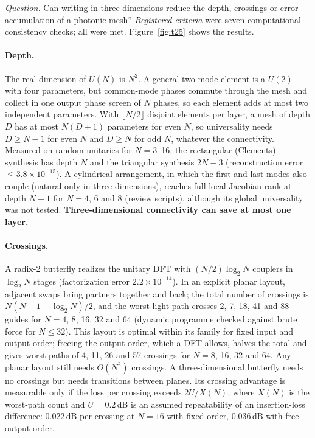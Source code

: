 \documentclass[10pt,a4paper]{article}
\begin{document}
\emph{Question.} Can writing in three dimensions reduce the depth, crossings or error accumulation of a photonic mesh? \emph{Registered criteria} were seven computational consistency checks; all were met. Figure~\ref{fig:t25} shows the results.

\paragraph{Depth.} The real dimension of $U(N)$ is $N^2$. A general two-mode element is a $U(2)$ with four parameters, but common-mode phases commute through the mesh and collect in one output phase screen of $N$ phases, so each element adds at most two independent parameters. With $\lfloor N/2\rfloor$ disjoint elements per layer, a mesh of depth $D$ has at most $N(D+1)$ parameters for even $N$, so universality needs $D\ge N-1$ for even $N$ and $D\ge N$ for odd $N$, whatever the connectivity. Measured on random unitaries for $N=3$--16, the rectangular (Clements) synthesis \cite{Clements2016} has depth $N$ and the triangular synthesis $2N-3$ (reconstruction error $\le3.8\times10^{-15}$). A cylindrical arrangement, in which the first and last modes also couple (natural only in three dimensions), reaches full local Jacobian rank at depth $N-1$ for $N=4$, 6 and 8 (review scripts), although its global universality was not tested. \textbf{Three-dimensional connectivity can save at most one layer.}

\paragraph{Crossings.} A radix-2 butterfly realizes the unitary DFT with $(N/2)\log_2N$ couplers in $\log_2N$ stages (factorization error $2.2\times10^{-14}$). In an explicit planar layout, adjacent swaps bring partners together and back; the total number of crossings is $N(N-1-\log_2N)/2$, and the worst light path crosses 2, 7, 18, 41 and 88 guides for $N=4$, 8, 16, 32 and 64 (dynamic programme checked against brute force for $N\le32$). This layout is optimal within its family for fixed input and output order; freeing the output order, which a DFT allows, halves the total and gives worst paths of 4, 11, 26 and 57 crossings for $N=8$, 16, 32 and 64. Any planar layout still needs $\Theta(N^2)$ crossings. A three-dimensional butterfly needs no crossings but needs transitions between planes. Its crossing advantage is measurable only if the loss per crossing exceeds $2U/X(N)$, where $X(N)$ is the worst-path count and $U=0.2$\,dB is an assumed repeatability of an insertion-loss difference: 0.022\,dB per crossing at $N=16$ with fixed order, 0.036\,dB with free output order.
\end{document}
